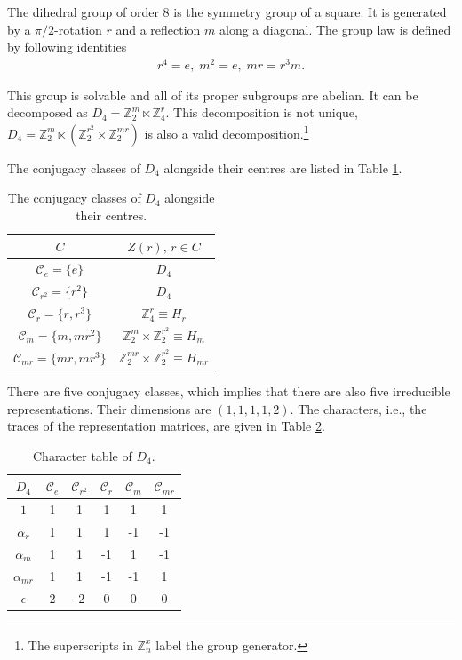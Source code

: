 \documentclass[two column]{article}
\begin{document}
The dihedral group of order 8 is the symmetry group of a square. It is generated by a $\pi/2$-rotation $r$ and a reflection  $m$ along a diagonal.
The group law is defined by following identities
\begin{equation}
	\begin{split}
		r^4 = e,\;
		m^2 = e,	\;	mr = r^3m. \label{eqn:group}
	\end{split}
\end{equation}

This group is solvable and all of its proper subgroups are abelian. It can be decomposed as $D_4 = \mathbb{Z}^m_2 \ltimes \mathbb{Z}^r_4$.
This decomposition is not unique, $D_4 = \mathbb{Z}_2^m\ltimes(\mathbb{Z}_2^{r^2}\times\mathbb{Z}^{mr}_2)$ is also a valid decomposition.\footnote{The superscripts in $\mathbb{Z}_n^x$ label the group generator.}

The conjugacy classes of $D_4$ alongside their centres are listed in Table \ref{tab:conjs}.
\begin{table}[h]
\centering    \begin{tabular}{|c | c|}\hline
         $C$ & $Z(r) \text{, } r\in C$\\ \hline $\mathcal C_e = \{e\}$ & $D_4$\\ $\mathcal C_{r^2}= \{r^2\}$ & $D_4$\\ $\mathcal C_{r}=\{r, r^3\}$ & $\mathbb{Z}_4^r \equiv H_r$\\ $\mathcal C_m=\{m, mr^2\}$& $\mathbb{Z}_2^m \times \mathbb{Z}_2^{r^2}\equiv H_m$ \\ $\mathcal C_{mr}=\{mr, mr^3\}$& $\mathbb{Z}_2^{mr} \times \mathbb{Z}_2^{r^2}\equiv H_{mr}$\\
         \hline 
    \end{tabular}
    \caption{The conjugacy classes of $D_4$ alongside their centres.}\label{tab:conjs}
\end{table}
There are five conjugacy classes, which implies that there are also five irreducible representations. Their dimensions are $(1,1,1,1,2)$. The characters, i.e., the traces of the representation matrices, are given in Table \ref{tab:char}.
\begin{table}[h]
\centering    \begin{tabular}{|c|c c c c c |}
         \hline
         $D_4$ & $\mathcal C_e$ & $\mathcal C_{r^2}$ & $\mathcal C_{r}$ & $\mathcal C_m$ & $\mathcal C_{mr}$ \\
         \hline
         $1$ & 1 & 1 & 1 & 1 & 1 \\
         $\alpha_r $& 1 & 1 & 1 & -1 & -1  \\
         $\alpha_{m}$ & 1 & 1 & -1 & 1 & -1  \\
         $\alpha_{mr}$ & 1 & 1 & -1 & -1 & 1  \\
         $\epsilon$ & 2 & -2 & 0 & 0 & 0  \\
         \hline 
    \end{tabular}
    \caption{Character table of $D_4$.}\label{tab:char}
\end{table}
\end{document}
